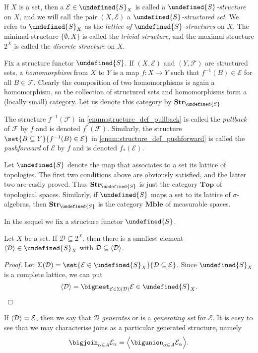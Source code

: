 \documentclass[article, a4paper, 11pt, oneside]{memoir}
\let\mathfrak\undefined
\numberwithin{equation}{chapter}
\newcommand{\calE}{\mathcal{E}}
\newcommand{\calD}{\mathcal{D}}
\newcommand{\calF}{\mathcal{F}}
\newcommand{\strucS}{\mathfrak{S}}
\DeclarePairedDelimiter{\gen}{\langle}{\rangle} %
\newcommand{\powerset}[1]{2^{#1}}
\newcommand{\ncat}[1]{\mathbf{#1}} %
\newcommand{\catTop}{\ncat{Top}} %
\newcommand{\catMble}{\ncat{Mble}} %
\newcommand{\catStruc}[1]{\ncat{Str}_{#1}} %
\newcommand{\catStrucS}{\catStruc{\strucS}} %
\begin{document}
If $X$ is a set, then a $\calE \in \strucS_X$ is called a \emph{$\strucS$-structure} on $X$, and we will call the pair $(X, \calE)$ a \emph{$\strucS$-structured set}. We refer to $\strucS_X$ as the \emph{lattice of $\strucS$-structures} on $X$. The minimal structure $\{\emptyset, X\}$ is called the \emph{trivial structure}, and the maximal structure $\powerset{X}$ is called the \emph{discrete structure} on $X$.

Fix a structure functor $\strucS$. If $(X, \calE)$ and $(Y, \calF)$ are structured sets, a \emph{homomorphism} from $X$ to $Y$ is a map $f \colon X \to Y$ such that $f^{-1}(B) \in \calE$ for all $B \in \calF$. Clearly the composition of two homomorphisms is again a homomorphism, so the collection of structured sets and homomorphisms form a (locally small) category. Let us denote this category by $\catStrucS$.

The structure $f^{-1}(\calF)$ in \cref{enum:structure_def_pullback} is called the \emph{pullback} of $\calF$ by $f$ and is denoted $f^*(\calF)$. Similarly, the structure $\set{B \subseteq Y}{f^{-1}(B) \in \calE}$ in \cref{enum:structure_def_pushforward} is called the \emph{pushforward} of $\calE$ by $f$ and is denoted $f_*(\calE)$.

\begin{example}
    Let $\strucS$ denote the map that associates to a set its lattice of topologies. The first two conditions above are obviously satisfied, and the latter two are easily proved. Thus $\catStrucS$ is just the category $\catTop$ of topological spaces. Similarly, if $\strucS$ maps a set to its lattice of $\sigma$-algebras, then $\catStrucS$ is the category $\catMble$ of measurable spaces.
\end{example}

In the sequel we fix a structure functor $\strucS$.

\begin{lemma}
    Let $X$ be a set. If $\calD \subseteq \powerset{X}$, then there is a smallest element $\gen{\calD} \in \strucS_X$ with $\calD \subseteq \gen{\calD}$.
\end{lemma}

\begin{proof}
    Let $\Sigma(\calD) = \set{\calE \in \strucS_X}{\calD \subseteq \calE}$. Since $\strucS_X$ is a complete lattice, we can put
    \begin{equation*}
        \gen{\calD} = \bigmeet_{\calE \in \Sigma(\calD)} \calE \in \strucS_X.
    \end{equation*}
\end{proof}
%
If $\gen{\calD} = \calE$, then we say that $\calD$ \emph{generates} or is a \emph{generating set} for $\calE$. It is easy to see that we may characterise joins as a particular generated structure, namely
%
\begin{equation}
    \label{eq:join_as_generated_structure}
    \bigjoin_{\alpha \in A} \calE_\alpha
        = \gen[\Big]{ \bigunion_{\alpha \in A} \calE_\alpha }.
\end{equation}
\end{document}
